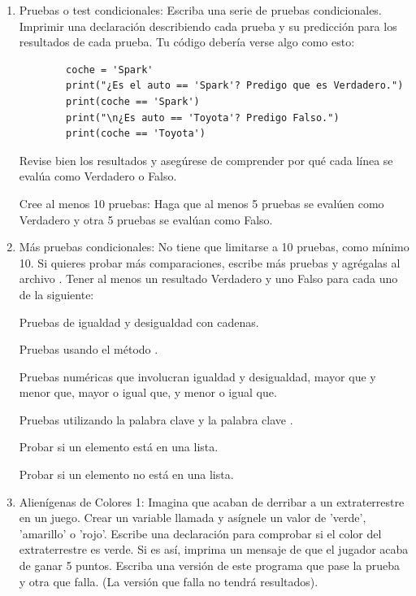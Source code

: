 \begin{enumerate}[6.5.1]
	
	\item   Pruebas o test condicionales: Escriba una serie de pruebas condicionales. Imprimir una declaración
	describiendo cada prueba y su predicción para los resultados de cada prueba. Tu código debería verse algo como esto:
	
	\begin{lstlisting}		
		coche = 'Spark'
		print("¿Es el auto == 'Spark'? Predigo que es Verdadero.")
		print(coche == 'Spark')
		print("\n¿Es auto == 'Toyota'? Predigo Falso.")
		print(coche == 'Toyota')
	\end{lstlisting}
	
	Revise bien los resultados y asegúrese de comprender por qué cada línea se evalúa como Verdadero o Falso.
	
	Cree al menos 10 pruebas: Haga que al menos 5 pruebas se evalúen como Verdadero y otra 5 pruebas se evalúan como Falso.
	
	
	\item  Más pruebas condicionales: No tiene que  limitarse a 10 pruebas, como mínimo 10. Si quieres probar más comparaciones, escribe más pruebas y agrégalas  al archivo {}. Tener al menos un resultado Verdadero y uno Falso para cada uno de la siguiente:
	
	Pruebas de igualdad y desigualdad con cadenas.
	
	Pruebas usando el método {}.
	
	Pruebas numéricas que involucran igualdad y desigualdad, mayor que y menor 	que, mayor o igual que, y menor o igual que.
	
	Pruebas utilizando la palabra clave {} y la palabra clave {}.
	
	Probar si un elemento está en una lista.
	
	Probar si un elemento no está en una lista.	
	
	
	\item Alienígenas de Colores 1: Imagina que acaban de derribar a un extraterrestre en un juego. Crear un
	variable llamada {} y asígnele un valor de 'verde', 'amarillo' o 'rojo'.	
	Escribe una declaración {} para comprobar si el color del extraterrestre es verde. Si es así, imprima
	un mensaje de que el jugador acaba de ganar 5 puntos.	
	Escriba una versión de este programa que pase la prueba {} y otra que
	falla. (La versión que falla no tendrá resultados).
	

\end{enumerate}
